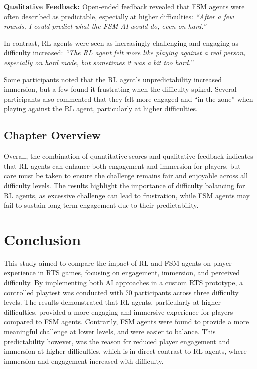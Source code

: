 \documentclass[conference]{IEEEtran}
\begin{document}
\textbf{Qualitative Feedback:}  
Open-ended feedback revealed that FSM agents were often described as predictable, especially at higher difficulties:  
\textit{“After a few rounds, I could predict what the FSM AI would do, even on hard.”}

In contrast, RL agents were seen as increasingly challenging and engaging as difficulty increased:  
\textit{“The RL agent felt more like playing against a real person, especially on hard mode, but sometimes it was a bit too hard.”}

Some participants noted that the RL agent's unpredictability increased immersion, but a few found it frustrating when the difficulty spiked.
Several participants also commented that they felt more engaged and “in the zone” when playing against the RL agent, particularly at higher difficulties.

\subsection{Chapter Overview}
Overall, the combination of quantitative scores and qualitative feedback indicates that RL agents can enhance both engagement and immersion for players,
but care must be taken to ensure the challenge remains fair and enjoyable across all difficulty levels.
The results highlight the importance of difficulty balancing for RL agents, as excessive challenge can lead to frustration,
while FSM agents may fail to sustain long-term engagement due to their predictability.

\section{Conclusion}

This study aimed to compare the impact of RL and FSM agents on player experience in RTS games, focusing on engagement, immersion, and perceived difficulty. By implementing both AI approaches in a custom RTS prototype,
a controlled playtest was conducted with 30 participants across three difficulty levels. The results demonstrated that RL agents, particularly at higher difficulties, provided a more engaging and immersive experience
for players compared to FSM agents. Contrarily, FSM agents were found to provide a more meaningful challenge at lower levels, and were easier to balance. This predictability however, was the reason for reduced
player engagement and immersion at higher difficulties, which is in direct contrast to RL agents, where immersion and engagement increased with difficulty.
\end{document}
